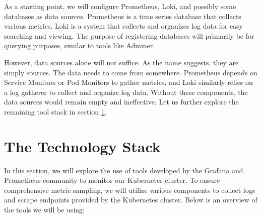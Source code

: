 As a starting point, we will configure Prometheus, Loki, and possibly some databases as data sources. Prometheus is a time series database that collects various metrics. Loki is a system that collects and organizes log data for easy searching and viewing. The purpose of registering databases will primarily be for querying purposes, similar to tools like Adminer.

However, data sources alone will not suffice. As the name suggests, they are simply sources. The data needs to come from somewhere. Prometheus depends on Service Monitors or Pod Monitors to gather metrics, and Loki similarly relies on a log gatherer to collect and organize log data. Without these components, the data sources would remain empty and ineffective. Let us further explore the remaining tool stack in section \ref{sec:monitoring_stack}.

\section{The Technology Stack}\label{sec:monitoring_stack}
In this section, we will explore the use of tools developed by the Grafana and Prometheus community to monitor our Kubernetes cluster. To ensure comprehensive metric sampling, we will utilize various components to collect logs and scrape endpoints provided by the Kubernetes cluster. Below is an overview of the tools we will be using:

